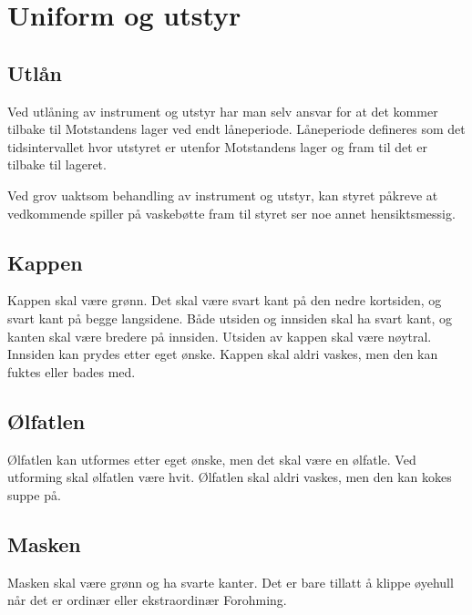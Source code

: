 \section{Uniform og utstyr}
    \subsection{Utlån}
        \begin{statute}
            Ved utlåning av instrument og utstyr har man selv ansvar for at det kommer tilbake til Motstandens lager ved endt låneperiode. Låneperiode defineres som det tidsintervallet hvor utstyret er utenfor Motstandens lager og fram til det er tilbake til lageret.
        \end{statute}
        \begin{statute}
            Ved grov uaktsom behandling av instrument og utstyr, kan styret påkreve at vedkommende spiller på vaskebøtte fram til styret ser noe annet hensiktsmessig. 
        \end{statute}

    \subsection{Kappen}
            \begin{statute}
                Kappen skal være grønn. Det skal være svart kant på den nedre kortsiden, og svart kant på begge langsidene. Både utsiden og innsiden skal ha svart kant, og kanten skal være bredere på innsiden. Utsiden av kappen skal være nøytral. Innsiden kan prydes etter eget ønske. Kappen skal aldri vaskes, men den kan fuktes eller bades med.
            \end{statute}

    \subsection{Ølfatlen}
        \begin{statute}
            Ølfatlen kan utformes etter eget ønske, men det skal være en ølfatle. Ved utforming skal ølfatlen være hvit. Ølfatlen skal aldri vaskes, men den kan kokes suppe på.
        \end{statute}
        
    \subsection{Masken}
        \begin{statute}
            Masken skal være grønn og ha svarte kanter. Det er bare tillatt å klippe øyehull når det er ordinær eller ekstraordinær Forohming.
        \end{statute}
        
